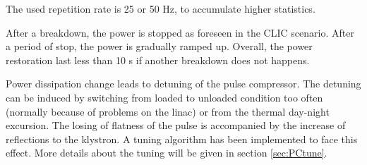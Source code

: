 The used repetition rate is 25 or 50 Hz, to accumulate higher statistics.

After a breakdown, the power is stopped as foreseen in the CLIC scenario. After a period of stop, the power is gradually ramped up. Overall, the power restoration last less than 10 s if another breakdown does not happens.

Power dissipation change leads to detuning of the pulse compressor. The detuning can be induced by switching from loaded to unloaded condition too often (normally because of problems on the linac) or from the thermal day-night excursion. The losing of flatness of the pulse is accompanied by the increase of reflections to the klystron. A tuning algorithm has been implemented to face this effect. More details about the tuning will be given in section \ref{sec:PCtune}.